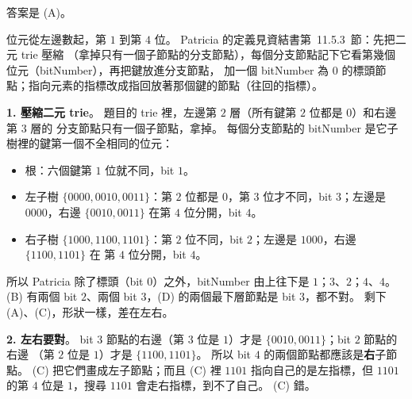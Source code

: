 \begin{pastsoln}
答案是 (A)。

位元從左邊數起，第 $1$ 到第 $4$ 位。 Patricia 的定義見資結書第~11.5.3~節：先把二元 trie 壓縮
（拿掉只有一個子節點的分支節點），每個分支節點記下它看第幾個位元（bitNumber），再把鍵放進分支節點，
加一個 bitNumber 為 $0$ 的標頭節點；指向元素的指標改成指回放著那個鍵的節點（往回的指標）。

\textbf{1. 壓縮二元 trie}。 題目的 trie 裡，左邊第 $2$ 層（所有鍵第 $2$ 位都是 $0$）和右邊第 $3$ 層的
分支節點只有一個子節點，拿掉。 每個分支節點的 bitNumber 是它子樹裡的鍵第一個不全相同的位元：
\begin{itemize}
\item 根：六個鍵第 $1$ 位就不同，bit $1$。
\item 左子樹 $\{0000, 0010, 0011\}$：第 $2$ 位都是 $0$，第 $3$ 位才不同，bit $3$；左邊是 $0000$，右邊
$\{0010, 0011\}$ 在第 $4$ 位分開，bit $4$。
\item 右子樹 $\{1000, 1100, 1101\}$：第 $2$ 位不同，bit $2$；左邊是 $1000$，右邊 $\{1100, 1101\}$ 在
第 $4$ 位分開，bit $4$。
\end{itemize}
所以 Patricia 除了標頭（bit $0$）之外，bitNumber 由上往下是 $1$；$3$、$2$；$4$、$4$。 (B) 有兩個 bit
$2$、兩個 bit $3$，(D) 的兩個最下層節點是 bit $3$，都不對。 剩下 (A)、(C)，形狀一樣，差在左右。

\textbf{2. 左右要對}。 bit $3$ 節點的右邊（第 $3$ 位是 $1$）才是 $\{0010, 0011\}$；bit $2$ 節點的右邊
（第 $2$ 位是 $1$）才是 $\{1100, 1101\}$。 所以 bit $4$ 的兩個節點都應該是\textbf{右}子節點。 (C)
把它們畫成左子節點；而且 (C) 裡 $1101$ 指向自己的是左指標，但 $1101$ 的第 $4$ 位是 $1$，搜尋
$1101$ 會走右指標，到不了自己。 (C) 錯。


\end{pastsoln}
